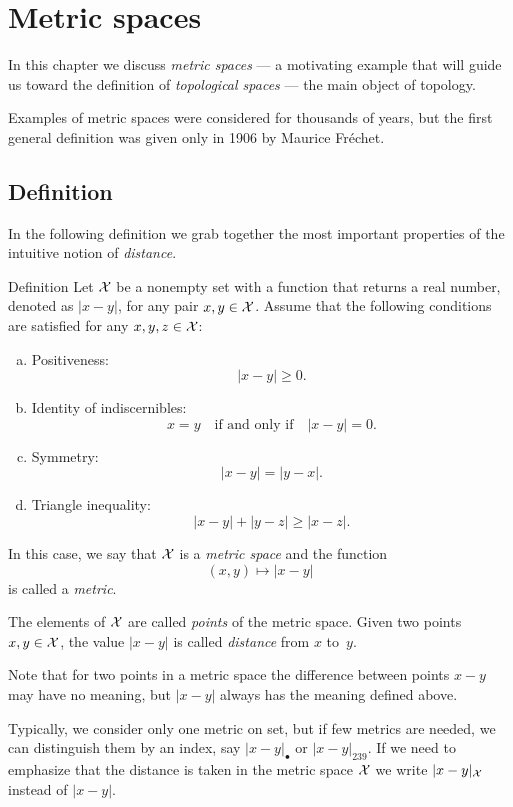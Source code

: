 \chapter{Metric spaces}

In this chapter we discuss \emph{metric spaces} --- 
a motivating example that will guide us toward the definition of \emph{topological spaces} --- the main object of topology.

Examples of metric spaces were considered for thousands of years,
but the first general definition was given only in 1906 by Maurice Fr\'echet.

\section{Definition}

In the following definition we grab together the most important properties of the intuitive notion of \emph{distance}.

\begin{thm}{Definition}\label{def:metric-space}
Let $\mathcal X$ be a nonempty set 
with a function 
that returns a real number, denoted as $|x-y|$,
for any pair $x,y\in\mathcal X$.
Assume that the following conditions are satisfied for any
$x,y,z\in \mathcal X$:
\begin{enumerate}[(a)]
\item\label{def:metric-space:a} Positiveness: 
$$|x-y|\ge 0.$$
\item\label{def:metric-space:b} Identity of indiscernibles:  
$$x=y\quad\text{if and only if}\quad |x-y|=0.$$
\item\label{def:metric-space:c} Symmetry: $$|x-y| = |y- x|.$$
\item\label{def:metric-space:d} Triangle inequality: 
$$  |x- y| + |y- z| \ge |x-z|.$$
\end{enumerate}
In this case, we say that $\mathcal X$ is a \emph{metric space} 
and the function 
\[(x,y)\mapsto |x-y|\] 
is called a \emph{metric}. 

The elements of $\mathcal X$ are called \emph{points} of the metric space.
Given two points $x,y\z\in \c X$, 
the value $|x-y|$ is called \emph{distance} from $x$ to~$y$.
\end{thm}

Note that for two points in a metric space  the difference between points $x-y$ may have no meaning,
but $|x-y|$ always has the meaning defined above.

Typically, we consider only one metric on set, 
but if few metrics are needed, we can distinguish them by an index, say  $|x-y|_{\bullet}$ or $|x-y|_{239}$.
If we need to emphasize that the distance is taken in the metric space $\mathcal{X}$ we write $|x-y|_{\mathcal X}$ instead of $|x-y|$.

